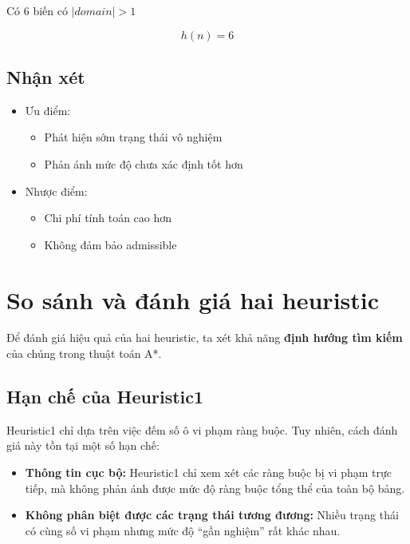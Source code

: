 Có 6 biến có $|domain| > 1$

\[
h(n) = 6
\]

\subsection{Nhận xét}

\begin{itemize}
    \item Ưu điểm:
    \begin{itemize}
        \item Phát hiện sớm trạng thái vô nghiệm
        \item Phản ánh mức độ chưa xác định tốt hơn
    \end{itemize}
    \item Nhược điểm:
    \begin{itemize}
        \item Chi phí tính toán cao hơn
        \item Không đảm bảo admissible
    \end{itemize}
\end{itemize}


\section{So sánh và đánh giá hai heuristic}

Để đánh giá hiệu quả của hai heuristic, ta xét khả năng \textbf{định hướng tìm kiếm} của chúng trong thuật toán A*.

\subsection{Hạn chế của Heuristic1}

Heuristic1 chỉ dựa trên việc đếm số ô vi phạm ràng buộc. Tuy nhiên, cách đánh giá này tồn tại một số hạn chế:

\begin{itemize}
    \item \textbf{Thông tin cục bộ:} Heuristic1 chỉ xem xét các ràng buộc bị vi phạm trực tiếp, mà không phản ánh được mức độ ràng buộc tổng thể của toàn bộ bảng.
    
    \item \textbf{Không phân biệt được các trạng thái tương đương:} Nhiều trạng thái có cùng số vi phạm nhưng mức độ ``gần nghiệm'' rất khác nhau.
    
\end{itemize}

